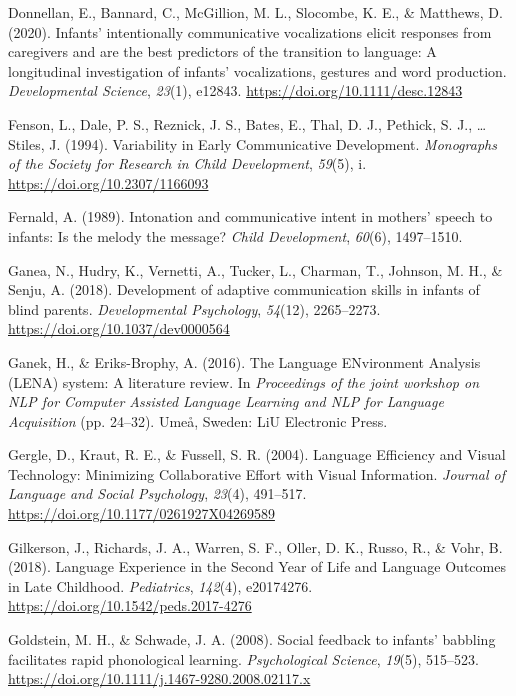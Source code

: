 \documentclass[english,man]{apa6}
\begin{document}
\leavevmode\hypertarget{ref-donnellan2020}{}%
Donnellan, E., Bannard, C., McGillion, M. L., Slocombe, K. E., \& Matthews, D. (2020). Infants' intentionally communicative vocalizations elicit responses from caregivers and are the best predictors of the transition to language: A longitudinal investigation of infants' vocalizations, gestures and word production. \emph{Developmental Science}, \emph{23}(1), e12843. \url{https://doi.org/10.1111/desc.12843}

\leavevmode\hypertarget{ref-fenson1994}{}%
Fenson, L., Dale, P. S., Reznick, J. S., Bates, E., Thal, D. J., Pethick, S. J., \ldots{} Stiles, J. (1994). Variability in Early Communicative Development. \emph{Monographs of the Society for Research in Child Development}, \emph{59}(5), i. \url{https://doi.org/10.2307/1166093}

\leavevmode\hypertarget{ref-fernald1989}{}%
Fernald, A. (1989). Intonation and communicative intent in mothers' speech to infants: Is the melody the message? \emph{Child Development}, \emph{60}(6), 1497--1510.

\leavevmode\hypertarget{ref-ganea2018}{}%
Ganea, N., Hudry, K., Vernetti, A., Tucker, L., Charman, T., Johnson, M. H., \& Senju, A. (2018). Development of adaptive communication skills in infants of blind parents. \emph{Developmental Psychology}, \emph{54}(12), 2265--2273. \url{https://doi.org/10.1037/dev0000564}

\leavevmode\hypertarget{ref-ganek2016}{}%
Ganek, H., \& Eriks-Brophy, A. (2016). The Language ENvironment Analysis (LENA) system: A literature review. In \emph{Proceedings of the joint workshop on NLP for Computer Assisted Language Learning and NLP for Language Acquisition} (pp. 24--32). Umeå, Sweden: LiU Electronic Press.

\leavevmode\hypertarget{ref-gergle2004}{}%
Gergle, D., Kraut, R. E., \& Fussell, S. R. (2004). Language Efficiency and Visual Technology: Minimizing Collaborative Effort with Visual Information. \emph{Journal of Language and Social Psychology}, \emph{23}(4), 491--517. \url{https://doi.org/10.1177/0261927X04269589}

\leavevmode\hypertarget{ref-gilkerson2018}{}%
Gilkerson, J., Richards, J. A., Warren, S. F., Oller, D. K., Russo, R., \& Vohr, B. (2018). Language Experience in the Second Year of Life and Language Outcomes in Late Childhood. \emph{Pediatrics}, \emph{142}(4), e20174276. \url{https://doi.org/10.1542/peds.2017-4276}

\leavevmode\hypertarget{ref-goldstein2008}{}%
Goldstein, M. H., \& Schwade, J. A. (2008). Social feedback to infants' babbling facilitates rapid phonological learning. \emph{Psychological Science}, \emph{19}(5), 515--523. \url{https://doi.org/10.1111/j.1467-9280.2008.02117.x}
\end{document}

